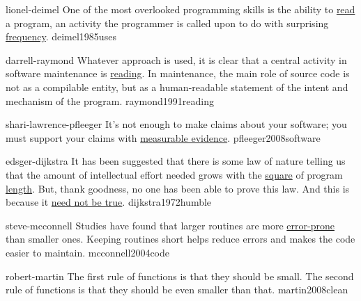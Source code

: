 \documentclass{article}
\begin{document}

\qte
  {lionel-deimel}
  {One of the most overlooked programming skills is the ability to \ul{read} a program, an activity the programmer is called upon to do with surprising \ul{frequency}.}
  {deimel1985uses}

\qte
  {darrell-raymond}
  {Whatever approach is used, it is clear that a central activity in software maintenance is \ul{reading}. In maintenance, the main role of source code is not as a compilable entity, but as a human-readable statement of the intent and mechanism of the program.}
  {raymond1991reading}

\qte
  {shari-lawrence-pfleeger}
  {It's not enough to make claims about your software; you must support your claims with \ul{measurable evidence}.}
  {pfleeger2008software}




\qte
  {edsger-dijkstra}
  {It has been suggested that there is some law of nature telling us that the amount of intellectual effort needed grows with the \ul{square} of program \ul{length}. But, thank goodness, no one has been able to prove this law. And this is because it \ul{need not be true}.}
  {dijkstra1972humble}

\qte
  {steve-mcconnell}
  {Studies have found that larger routines are more \ul{error-prone} than smaller ones. Keeping routines short helps reduce errors and makes the code easier to maintain.}
  {mcconnell2004code}

\qte
  {robert-martin}
  {The first rule of functions is that they should be small. The second rule of functions is that they should be even smaller than that.}
  {martin2008clean}





\end{document}
